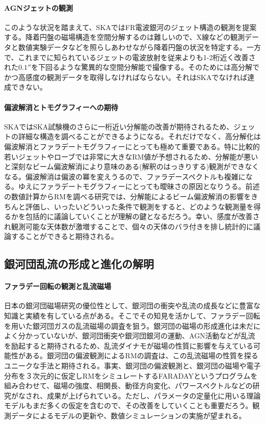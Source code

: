 \paragraph{AGNジェットの観測}

このような状況を踏まえて、SKAではFR電波銀河のジェット構造の観測を提案する。降着円盤の磁場構造を空間分解するのは難しいので、X線などの観測データと数値実験データなどを照らしあわせながら降着円盤の状況を特定する。一方で、これまでに知られているジェットの電波放射を従来よりも1-2桁近く改善された$0.1''$を下回るような驚異的な空間分解能で撮像する。そのためには高分解でかつ高感度の観測データを取得しなければならない。それはSKAでなければ達成できない。

\paragraph{偏波解消とトモグラフィーへの期待}

SKAではSKA試験機のさらに一桁近い分解能の改善が期待されるため、ジェットの詳細な構造を調べることができるようになる。それだけでなく、高分解化は偏波解消とファラデートモグラフィーにとっても極めて重要である。特に比較的若いジェットやローブでは非常に大きなRM値が予想されるため、分解能が悪いと深刻なビーム偏波解消により意味のある(解釈のはっきりする)観測ができなくなる。偏波解消は偏波の冪を変えうるので、ファラデースペクトルも複雑になる。ゆえにファラデートモグラフィーにとっても曖昧さの原因となりうる。前述の数値計算からRMを調べる研究では、分解能によるビーム偏波解消の影響をきちんと評価し、いったいどういった条件で観測をすると、どのような観測量を得るかを包括的に議論していくことが理解の鍵となるだろう。幸い、感度が改善され観測可能な天体数が激増することで、個々の天体のバラ付きを排し統計的に議論することができると期待される。


\subsection{銀河団乱流の形成と進化の解明}
\label{c06.s3.ss6}

\paragraph{ファラデー回転の観測と乱流磁場}

日本の銀河団磁場研究の優位性として、銀河団の衝突や乱流の成長などに豊富な知識と実績を有している点がある。そこでその知見を活かして、ファラデー回転を用いた銀河団ガスの乱流磁場の調査を狙う。銀河団の磁場の形成進化は未だによく分かっていないが、銀河団衝突や銀河団銀河の運動、AGN活動などが乱流を励起すると期待されるため、乱流ダイナモが磁場の性質に影響を与えている可能性がある\citep{2008Sci...320..909R}。銀河団の偏波観測によるRMの調査は、この乱流磁場の性質を探るユニークな手法と期待される。事実、銀河団の偏波観測と、銀河団の磁場や電子分布を３次元的に仮定しRMをシミュレートするFARADAYというプログラムを組み合わせて、磁場の強度、相関長、動径方向変化、パワースペクトルなどの研究がなされ、成果が上げられている\citep{2008A&A...483..699G}。ただし、パラメータの定量化に用いる理論モデルもまだ多くの仮定を含むので、その改善をしていくことも重要だろう。観測データによるモデルの更新や、数値シミュレーションの実施が望まれる。

